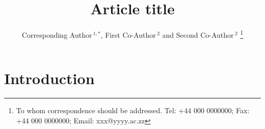 \documentclass[a4,center,fleqn]{NAR}
\begin{document}
\title{Article title}

\author{%
Corresponding Author\,$^{1,*}$,
First Co-Author\,$^{2}$
and Second Co-Author\,$^2$%
\footnote{To whom correspondence should be addressed.
Tel: +44 000 0000000; Fax: +44 000 0000000; Email: xxx@yyyy.ac.zz}}

\address{%
$^{1}$Affiliation of Corresponding Author
and
$^{2}$Affiliation of Both Co-Authors}


\maketitle

\begin{abstract}

\end{abstract}


\section{Introduction}
\end{document}
